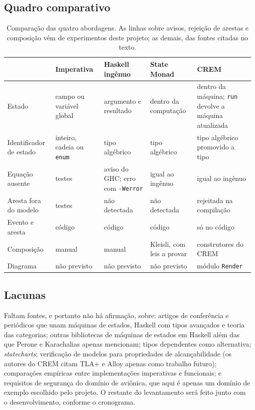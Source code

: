 \documentclass[12pt,a4paper]{article}
\begin{document}
\subsection{Quadro comparativo}

\begin{table}[h]
\centering
\footnotesize
\begin{tabular}{|p{2.5cm}|p{2.7cm}|p{2.7cm}|p{2.7cm}|p{3.0cm}|}
\hline
 & Imperativa & Haskell ingênuo & State Monad & CREM \\
\hline
Estado & campo ou variável global & argumento e resultado & dentro da computação & dentro da máquina; \texttt{run} devolve a máquina atualizada \\
\hline
Identificador de estado & inteiro, cadeia ou \texttt{enum} & tipo algébrico & tipo algébrico & tipo algébrico promovido a tipo \\
\hline
Equação ausente & testes & aviso do GHC; erro com \texttt{-Werror} & igual ao ingênuo & igual ao ingênuo \\
\hline
Aresta fora do modelo & testes & não detectada & não detectada & rejeitada na compilação \\
\hline
Evento e aresta & código & código & código & só no código \\
\hline
Composição & manual & manual & Kleisli, com leis a provar & construtores do CREM \\
\hline
Diagrama & não previsto & não previsto & não previsto & módulo \texttt{Render} \\
\hline
\end{tabular}
\caption{Comparação das quatro abordagens. As linhas sobre avisos, rejeição de arestas e composição vêm de experimentos deste projeto; as demais, das fontes citadas no texto.}
\end{table}

\subsection{Lacunas}

Faltam fontes, e portanto não há afirmação, sobre: artigos de conferência e periódicos que unam máquinas de estados, Haskell com tipos avançados e teoria das categorias; outras bibliotecas de máquinas de estados em Haskell além das que Perone e Karachalias apenas mencionam; tipos dependentes como alternativa; \textit{statecharts}; verificação de modelos para propriedades de alcançabilidade (os autores do CREM citam TLA+ e Alloy apenas como trabalho futuro); comparações empíricas entre implementações imperativas e funcionais; e requisitos de segurança do domínio de aviônica, que aqui é apenas um domínio de exemplo escolhido pelo projeto. O restante do levantamento será feito junto com o desenvolvimento, conforme o cronograma.
\end{document}
